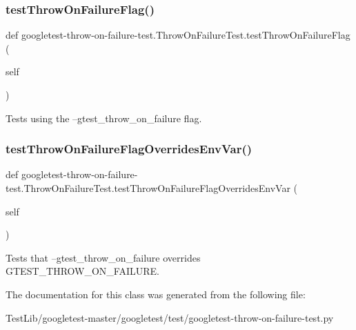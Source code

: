 \subsubsection{\texorpdfstring{test\+Throw\+On\+Failure\+Flag()}{testThrowOnFailureFlag()}}
{\footnotesize\ttfamily def googletest-\/throw-\/on-\/failure-\/test.\+Throw\+On\+Failure\+Test.\+test\+Throw\+On\+Failure\+Flag (\begin{DoxyParamCaption}\item[{}]{self }\end{DoxyParamCaption})}

\begin{DoxyVerb}Tests using the --gtest_throw_on_failure flag.\end{DoxyVerb}
 \mbox{\label{classgoogletest-throw-on-failure-test_1_1ThrowOnFailureTest_a18515553dbfe7b3e6ed6449fa81893c1}} 
\subsubsection{\texorpdfstring{test\+Throw\+On\+Failure\+Flag\+Overrides\+Env\+Var()}{testThrowOnFailureFlagOverridesEnvVar()}}
{\footnotesize\ttfamily def googletest-\/throw-\/on-\/failure-\/test.\+Throw\+On\+Failure\+Test.\+test\+Throw\+On\+Failure\+Flag\+Overrides\+Env\+Var (\begin{DoxyParamCaption}\item[{}]{self }\end{DoxyParamCaption})}

\begin{DoxyVerb}Tests that --gtest_throw_on_failure overrides GTEST_THROW_ON_FAILURE.\end{DoxyVerb}
 

The documentation for this class was generated from the following file\+:\begin{DoxyCompactItemize}
\item 
Test\+Lib/googletest-\/master/googletest/test/googletest-\/throw-\/on-\/failure-\/test.\+py\end{DoxyCompactItemize}
